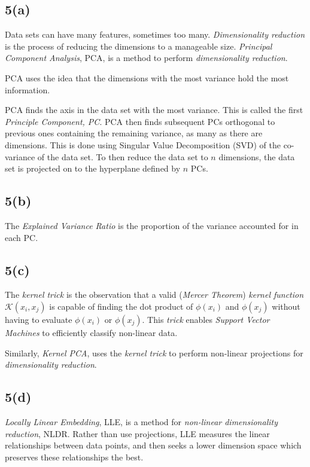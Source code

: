 \documentclass[12pt, a4paper,reqno]{article}
\begin{document}
\subsection*{5(a)}

Data sets can have many features, sometimes too many. \emph{Dimensionality reduction} is the process of reducing the dimensions to a manageable size. \emph{Principal Component Analysis}, PCA, is a method to perform \emph{dimensionality reduction}.

PCA uses the idea that the dimensions with the most variance hold the most information.

PCA finds the axis in the data set with the most variance. This is called the first \emph{Principle Component, PC}. PCA then finds subsequent PCs orthogonal to previous ones containing the remaining variance, as many as there are dimensions. This is done using Singular Value Decomposition (SVD) of the co-variance of the data set. To then reduce the data set to $n$ dimensions, the data set is projected on to the hyperplane defined by $n$ PCs.

\subsection*{5(b)}

The \emph{Explained Variance Ratio} is the proportion of the variance accounted for in each PC. 

\subsection*{5(c)}

The \emph{kernel trick} is the observation that a valid (\emph{Mercer Theorem}) \emph{kernel function} $\mathcal{K}(x_i, x_j)$ is capable of finding the dot product of $\phi(x_i)$ and $\phi(x_j)$ without having to evaluate $\phi(x_i)$ or $\phi(x_j)$. This \emph{trick} enables \emph{Support Vector Machines} to efficiently classify non-linear data.

Similarly, \emph{Kernel PCA}, uses the \emph{kernel trick} to perform non-linear projections for \emph{dimensionality reduction}.

\subsection*{5(d)}
\emph{Locally Linear Embedding}, LLE, is a method for \emph{non-linear dimensionality reduction}, NLDR. Rather than use projections, LLE measures the linear relationships between data points, and then seeks a lower dimension space which preserves these relationships the best. 
\end{document}
